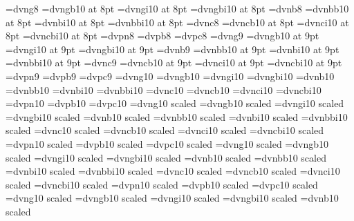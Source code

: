 %
%
\font\smalldn=dvng8
\font\smalldnb=dvngb10 at 8pt
\font\smalldni=dvngi10 at 8pt
\font\smalldnbi=dvngbi10 at 8pt
\font\smalldnbom=dvnb8
\font\smalldnbomb=dvnbb10 at 8pt
\font\smalldnbomi=dvnbi10 at 8pt
\font\smalldnbombi=dvnbbi10 at 8pt
\font\smalldncal=dvnc8
\font\smalldncalb=dvncb10 at 8pt
\font\smalldncali=dvnci10 at 8pt
\font\smalldncalbi=dvncbi10 at 8pt
\font\smalldnp=dvpn8
\font\smalldnpbom=dvpb8
\font\smalldnpcal=dvpc8
\font\ninedn=dvng9
\font\ninednb=dvngb10 at 9pt
\font\ninedni=dvngi10 at 9pt
\font\ninednbi=dvngbi10 at 9pt
\font\ninednbom=dvnb9
\font\ninednbomb=dvnbb10 at 9pt
\font\ninednbomi=dvnbi10 at 9pt
\font\ninednbombi=dvnbbi10 at 9pt
\font\ninedncal=dvnc9
\font\ninedncalb=dvncb10 at 9pt
\font\ninedncali=dvnci10 at 9pt
\font\ninedncalbi=dvncbi10 at 9pt
\font\ninednp=dvpn9
\font\ninednpbom=dvpb9
\font\ninednpcal=dvpc9
\font\dvng=dvng10
\font\dvngb=dvngb10
\font\dvngi=dvngi10
\font\dvngbi=dvngbi10
\font\dvngbom=dvnb10
\font\dvngbomb=dvnbb10
\font\dvngbomi=dvnbi10
\font\dvngbombi=dvnbbi10
\font\dvngcal=dvnc10
\font\dvngcalb=dvncb10
\font\dvngcali=dvnci10
\font\dvngcalbi=dvncbi10
\font\dvngp=dvpn10
\font\dvngpbom=dvpb10
\font\dvngpcal=dvpc10
\font\halfdn=dvng10 scaled\magstephalf
\font\halfdnb=dvngb10 scaled\magstephalf
\font\halfdni=dvngi10 scaled\magstephalf
\font\halfdnbi=dvngbi10 scaled\magstephalf
\font\halfdnbom=dvnb10 scaled\magstephalf
\font\halfdnbomb=dvnbb10 scaled\magstephalf
\font\halfdnbomi=dvnbi10 scaled\magstephalf
\font\halfdnbombi=dvnbbi10 scaled\magstephalf
\font\halfdncal=dvnc10 scaled\magstephalf
\font\halfdncalb=dvncb10 scaled\magstephalf
\font\halfdncali=dvnci10 scaled\magstephalf
\font\halfdncalbi=dvncbi10 scaled\magstephalf
\font\halfdnp=dvpn10 scaled\magstephalf
\font\halfdnpbom=dvpb10 scaled\magstephalf
\font\halfdnpcal=dvpc10 scaled\magstephalf
\font\bigdn=dvng10 scaled
\font\bigdnb=dvngb10 scaled
\font\bigdni=dvngi10 scaled
\font\bigdnbi=dvngbi10 scaled
\font\bigdnbom=dvnb10 scaled
\font\bigdnbomb=dvnbb10 scaled
\font\bigdnbomi=dvnbi10 scaled
\font\bigdnbombi=dvnbbi10 scaled
\font\bigdncal=dvnc10 scaled
\font\bigdncalb=dvncb10 scaled
\font\bigdncali=dvnci10 scaled
\font\bigdncalbi=dvncbi10 scaled
\font\bigdnp=dvpn10 scaled
\font\bigdnpbom=dvpb10 scaled
\font\bigdnpcal=dvpc10 scaled
\font\largedn=dvng10 scaled
\font\largednb=dvngb10 scaled
\font\largedni=dvngi10 scaled
\font\largednbi=dvngbi10 scaled
\font\largednbom=dvnb10 scaled
